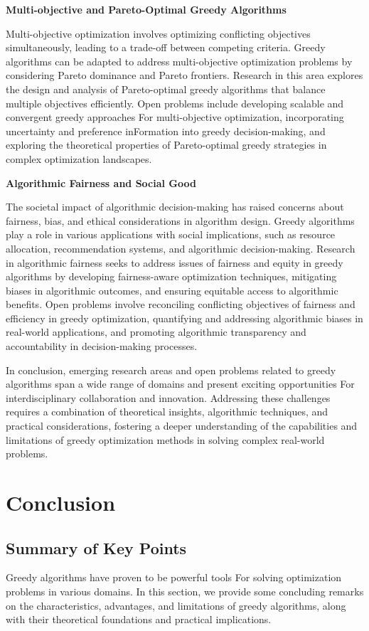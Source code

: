 \documentclass[12pt]{book} %
\begin{document}
\textbf{Multi-objective and Pareto-Optimal Greedy Algorithms}

Multi-objective optimization involves optimizing conflicting objectives simultaneously, leading to a trade-off between competing criteria. Greedy algorithms can be adapted to address multi-objective optimization problems by considering Pareto dominance and Pareto frontiers. Research in this area explores the design and analysis of Pareto-optimal greedy algorithms that balance multiple objectives efficiently. Open problems include developing scalable and convergent greedy approaches For multi-objective optimization, incorporating uncertainty and preference inFormation into greedy decision-making, and exploring the theoretical properties of Pareto-optimal greedy strategies in complex optimization landscapes.

\textbf{Algorithmic Fairness and Social Good}

The societal impact of algorithmic decision-making has raised concerns about fairness, bias, and ethical considerations in algorithm design. Greedy algorithms play a role in various applications with social implications, such as resource allocation, recommendation systems, and algorithmic decision-making. Research in algorithmic fairness seeks to address issues of fairness and equity in greedy algorithms by developing fairness-aware optimization techniques, mitigating biases in algorithmic outcomes, and ensuring equitable access to algorithmic benefits. Open problems involve reconciling conflicting objectives of fairness and efficiency in greedy optimization, quantifying and addressing algorithmic biases in real-world applications, and promoting algorithmic transparency and accountability in decision-making processes.

In conclusion, emerging research areas and open problems related to greedy algorithms span a wide range of domains and present exciting opportunities For interdisciplinary collaboration and innovation. Addressing these challenges requires a combination of theoretical insights, algorithmic techniques, and practical considerations, fostering a deeper understanding of the capabilities and limitations of greedy optimization methods in solving complex real-world problems.

\section{Conclusion}

\subsection{Summary of Key Points}
Greedy algorithms have proven to be powerful tools For solving optimization problems in various domains. In this section, we provide some concluding remarks on the characteristics, advantages, and limitations of greedy algorithms, along with their theoretical foundations and practical implications.
\end{document}

